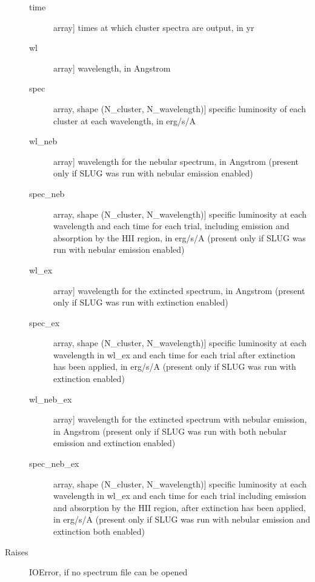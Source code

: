 \documentclass[letterpaper,10pt,english]{sphinxmanual}
\begin{document}
\begin{fulllineitems}
\begin{description}
\begin{description}
\item[{time}] \leavevmode{[}array{]}
times at which cluster spectra are output, in yr

\item[{wl}] \leavevmode{[}array{]}
wavelength, in Angstrom

\item[{spec}] \leavevmode{[}array, shape (N\_cluster, N\_wavelength){]}
specific luminosity of each cluster at each wavelength, in erg/s/A

\item[{wl\_neb}] \leavevmode{[}array{]}
wavelength for the nebular spectrum, in Angstrom (present
only if SLUG was run with nebular emission enabled)

\item[{spec\_neb}] \leavevmode{[}array, shape (N\_cluster, N\_wavelength){]}
specific luminosity at each wavelength and each time for each
trial, including emission and absorption by the HII region,
in erg/s/A (present only if SLUG was run with nebular
emission enabled)

\item[{wl\_ex}] \leavevmode{[}array{]}
wavelength for the extincted spectrum, in Angstrom (present
only if SLUG was run with extinction enabled)

\item[{spec\_ex}] \leavevmode{[}array, shape (N\_cluster, N\_wavelength){]}
specific luminosity at each wavelength in wl\_ex and each
time for each trial after extinction has been applied, in
erg/s/A (present only if SLUG was run with extinction
enabled)

\item[{wl\_neb\_ex}] \leavevmode{[}array{]}
wavelength for the extincted spectrum with nebular emission,
in Angstrom (present only if SLUG was run with both nebular
emission and extinction enabled)

\item[{spec\_neb\_ex}] \leavevmode{[}array, shape (N\_cluster, N\_wavelength){]}
specific luminosity at each wavelength in wl\_ex and each
time for each trial including emission and absorption by the
HII region, after extinction has been applied, in erg/s/A
(present only if SLUG was run with nebular emission and
extinction both enabled)

\end{description}

\item[{Raises}] \leavevmode
IOError, if no spectrum file can be opened

\end{description}

\end{fulllineitems}
\end{document}
